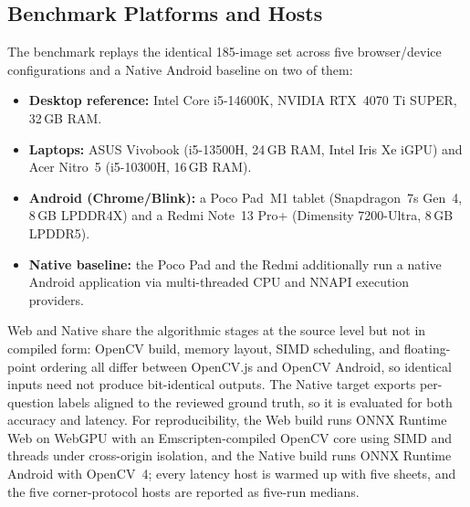 \documentclass[conference]{IEEEtran}
\begin{document}
\subsection{Benchmark Platforms and Hosts}
The benchmark replays the identical 185-image set across five browser/device configurations and
a Native Android baseline on two of them:
\begin{itemize}[leftmargin=*, itemsep=1pt, topsep=2pt]
  \item   \textbf{Desktop reference:} Intel Core i5-14600K, NVIDIA
  RTX~4070 Ti SUPER, 32\,GB RAM.
  \item \textbf{Laptops:} ASUS Vivobook (i5-13500H, 24\,GB RAM, Intel Iris Xe
  iGPU) and Acer Nitro~5 (i5-10300H, 16\,GB RAM).
  \item \textbf{Android (Chrome/Blink):} a Poco Pad~M1 tablet (Snapdragon~7s
  Gen~4, 8\,GB LPDDR4X) and a Redmi Note~13 Pro+ (Dimensity 7200-Ultra,
  8\,GB LPDDR5).

  \item \textbf{Native baseline:} the Poco Pad and the Redmi additionally
  run a native Android application via multi-threaded CPU and NNAPI
  execution providers.
\end{itemize}
Web and Native share the algorithmic stages at the source level but not in
compiled form: OpenCV build, memory layout, SIMD scheduling, and
floating-point ordering all differ between OpenCV.js and OpenCV Android, so
identical inputs need not produce bit-identical outputs. The Native target
exports per-question labels aligned to the reviewed ground truth, so it is
evaluated for both accuracy and latency. For reproducibility, the Web build
runs ONNX Runtime Web on WebGPU with an Emscripten-compiled OpenCV core
using SIMD and threads under cross-origin isolation, and the Native build
runs ONNX Runtime Android with OpenCV~4; every latency host is warmed up
with five sheets, and the five corner-protocol hosts are reported as five-run
medians.
\end{document}
